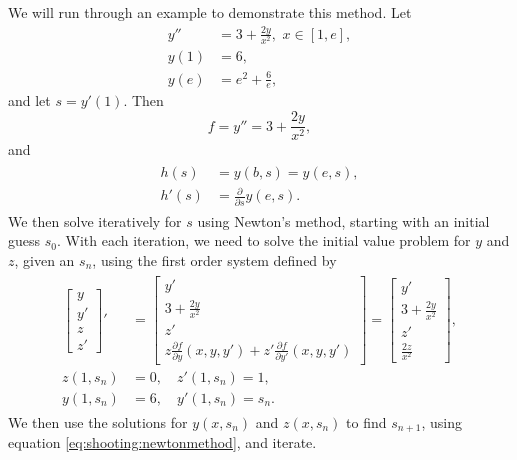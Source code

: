 We will run through an example to demonstrate this method. Let
\begin{equation*}
\begin{split}
y'' &= 3 + \frac{2y}{x^2}, \,\, x \in [1,e],\\
y(1) &= 6, \\
y(e) &= e^2 + \frac{6}{e},
\end{split}
\end{equation*}
and let $s=y'(1)$. Then
\begin{equation*}
f = y'' = 3 + \frac{2y}{x^2},
\end{equation*}
and
\begin{align*}
\begin{split}
h(s) &= y(b,s) = y(e,s),
\\
h'(s) &= \frac{\partial}{\partial s} y(e,s).
\end{split}
\end{align*}
We then solve iteratively for $s$ using Newton's method, starting with an initial guess $s_0$. With each iteration, we need to solve the initial value problem for $y$ and $z$, given an $s_n$, using the first order system defined by
\begin{align*}
\begin{split}
\begin{bmatrix}y\\y'\\z\\z'\end{bmatrix}'
&= \begin{bmatrix}y'\\3 + \frac{2y}{x^2}
\\z'\\z\frac{\partial f}{\partial y} (x,y,y') + z' \frac{\partial f}{\partial y'} (x,y,y')\end{bmatrix}
= \begin{bmatrix}y'\\3 + \frac{2y}{x^2}
\\z'\\ \frac{2z}{x^2}\end{bmatrix},
\\
z(1,s_n) &= 0, \quad z'(1,s_n) = 1,
\\
y(1,s_n) &= 6, \quad y'(1,s_n) = s_n.
\end{split}
\end{align*}
We then use the solutions for $y(x,s_n)$ and $z(x,s_n)$ to find $s_{n+1}$, using equation \ref{eq:shooting:newtonmethod}, and iterate.


